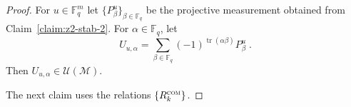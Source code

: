 \documentclass[11pt]{article}
\theoremstyle{definition}
\DeclareMathOperator*{\Expectation}{\mathbb{E}}
\newcommand{\Es}[1]{\Expectation_{#1}}
\newcommand{\F}{\ensuremath{\mathbb{F}}}
\newcommand{\com}{\textsc{com}}
\newcommand{\mM}{\ensuremath{\mathcal{M}}}
\newcommand{\mU}{\ensuremath{\mathcal{U}}}
\newcommand{\eps}{\varepsilon}
\DeclareMathOperator{\tr}{tr}
\begin{document}
\begin{proof}
For $u\in \F_q^m$ let $\{P^{u}_\beta\}_{\beta \in \F_q}$ be the projective measurement obtained from Claim~\ref{claim:z2-stab-2}. For $\alpha\in \F_q$, let  
\[ U_{u,\alpha} = \sum_{\beta\in\F_q} (-1)^{\tr(\alpha\beta)} P^u_{\beta}\;.\]
Then $U_{u,\alpha} \in \mU(\mM)$. 


The next claim uses the relations $\{R^\com_k\}$.


\end{proof}
\end{document}
